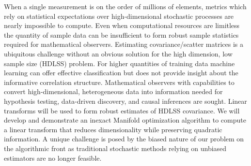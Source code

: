 When a single measurement is on the order of millions of elements, metrics which rely on statistical expectations over high-dimensional stochastic processes are nearly impossible to compute. Even when computational resources are limitless the quantity of sample data can be insufficient to form robust sample statistics required for mathematical observers. Estimating covariance/scatter matrices is a ubiquitous challenge without an obvious solution for the high dimension, low sample size (HDLSS) problem. For higher quantities of training data machine learning can offer effective classification but does not provide insight about the informative correlation structure. Mathematical observers with capabilities to convert high-dimensional, heterogeneous data into information needed for hypothesis testing, data-driven discovery, and causal inferences are sought. Linear transforms will be used to form robust estimates of HDLSS covariance. We will develop and demonstrate an inexact Manifold optimization algorithm to compute a linear transform that reduces dimensionality while preserving quadratic information. A unique challenge is posed by the biased nature of our problem on the algorithmic front as traditional stochastic methods relying on unbiased estimators are no longer feasible.
